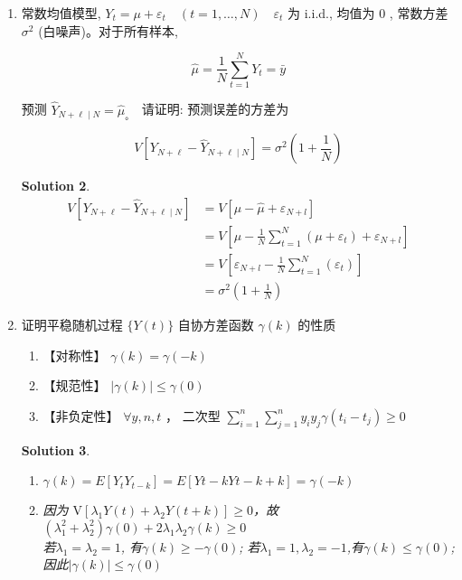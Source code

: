 \documentclass[a4paper,UTF8]{article}
\numberwithin{equation}{section}
\newtheorem*{mySol}{Solution}
\begin{document}
\begin{enumerate}
\begin{mySol}
 \end{mySol}



\item 常数均值模型, $Y_{t}=\mu+\varepsilon_{t} \quad (t=1, \ldots, N) \quad \varepsilon_{t}$ 为 i.i.d., 均值为 0 , 常数方差 $\sigma^{2}$ (白噪声)。对于所有样本,

$$
\hat{\mu}=\frac{1}{N} \sum_{t=1}^{N} Y_{t}=\bar{y}
$$

预测 $\hat{Y}_{N+\ell \mid N}=\hat{\mu}_{\text {。 }}$ 请证明: 预测误差的方差为

$$
V\left[Y_{N+\ell}-\hat{Y}_{N+\ell \mid N}\right]=\sigma^{2}\left(1+\frac{1}{N}\right)
$$


\begin{mySol}

	\begin{align*}
        V\left[Y_{N+\ell}-\hat{Y}_{N+\ell \mid N}\right] &= V[\mu-\hat{\mu}+\varepsilon_{N+l}] \\
        &= V\left[\mu-\frac{1}{N}\sum_{t=1}^{N}(\mu+\varepsilon_{t})+\varepsilon_{N+l}\right] \\
        &= V\left[\varepsilon_{N+l}-\frac{1}{N}\sum_{t=1}^{N}(\varepsilon_{t})\right] \\
        &= \sigma^{2}\left(1+\frac{1}{N}\right)
    \end{align*}

\end{mySol}




\item 证明平稳随机过程 $\{Y(t)\}$ 自协方差函数 $\gamma(k)$ 的性质
\begin{enumerate}[1)]
	\item【对称性】 $\gamma(k)=\gamma(-k)$

	\item【规范性】 $|\gamma(k)| \leq \gamma(0)$

	\item【非负定性】 $\forall y, n, t$ ， 二次型 $\sum_{i=1}^{n} \sum_{j=1}^{n} y_{i} y_{j} \gamma\left(t_{i}-t_{j}\right) \geq 0$
\end{enumerate}


\begin{mySol}
~\\
    \begin{enumerate}[1)]
    \item $\gamma(k)=E[Y_tY_{t-k}]=E[Y{t-k}Y{t-k+k}]=\gamma(-k)$

    \item 因为 $\mathrm{V}[\lambda_1 Y(t) + \lambda_2 Y(t+k)] \geq 0$，故$(\lambda_1^2 + \lambda_2^2) \gamma(0) + 2\lambda_1 \lambda_2 \gamma(k) \geq 0$ \\
    若$\lambda_1 = \lambda_2 = 1$, 有$\gamma(k) \geq -\gamma(0)$;
    若$\lambda_1 =1, \lambda_2 = -1$,有$\gamma(k) \leq \gamma(0)$;
    因此$|\gamma(k)| \leq \gamma(0)$


\end{enumerate}
\end{mySol}
\end{enumerate}
\end{document}
